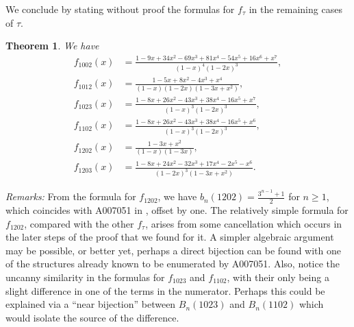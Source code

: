 \documentclass{article}
\theoremstyle{remark}
\theoremstyle{plain}
\newtheorem{theorem}{Theorem}[section]
\begin{document}
We conclude by stating without proof the formulas for $f_\tau$ in the remaining cases of $\tau$.

\begin{theorem}\label{other}
We have
\begin{align*}
f_{1002}(x)&=\frac{1-9x+34x^2-69x^3+81x^4-54x^5+16x^6+x^7}{(1-x)^4(1-2x)^3},\\
f_{1012}(x)&=\frac{1-5x+8x^2-4x^3+x^4}{(1-x)(1-2x)(1-3x+x^2)},\\
f_{1023}(x)&=\frac{1-8x+26x^2-43x^3+38x^4-16x^5+x^7}{(1-x)^3(1-2x)^3},\\
f_{1102}(x)&=\frac{1-8x+26x^2-43x^3+38x^4-16x^5+x^6}{(1-x)^3(1-2x)^3},\\
f_{1202}(x)&=\frac{1-3x+x^2}{(1-x)(1-3x)},\\
f_{1203}(x)&=\frac{1-8x+24x^2-32x^3+17x^4-2x^5-x^6}{(1-2x)^3(1-3x+x^2)}.
\end{align*}
\end{theorem}

\noindent\emph{Remarks:} From the formula for $f_{1202}$, we have $b_n(1202)=\frac{3^{n-1}+1}{2}$ for $n\geq1$, which coincides with A007051 in \cite{Sloane}, offset by one.  The relatively simple formula for $f_{1202}$, compared with the other $f_\tau$, arises from some cancellation which occurs in the later steps of the proof that we found for it.  A simpler algebraic argument may be possible, or better yet, perhaps a direct bijection can be found with one of the structures already known to be enumerated by A007051.  Also, notice the uncanny similarity in the formulas for $f_{1023}$ and $f_{1102}$, with their only being a slight difference in one of the terms in the numerator.  Perhaps this could be explained via a ``near bijection'' between $B_n(1023)$ and $B_n(1102)$ which would isolate the source of the difference.
\end{document}
